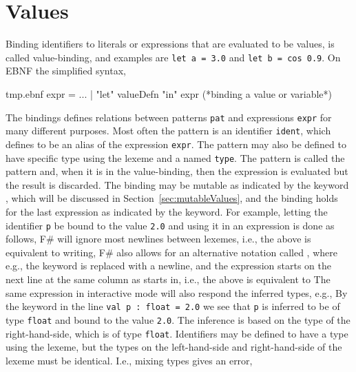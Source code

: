 \section{Values}
Binding identifiers to literals or expressions that are evaluated to be values, is called value-binding, and examples are \lstinline!let a = 3.0! and \lstinline!let b = cos 0.9!. On EBNF the simplified syntax,
%
\begin{verbatimwrite}{tmp.ebnf}
expr = ...
  | "let" valueDefn "in" expr (*binding a value or variable*)
\end{verbatimwrite}
%
The  bindings defines relations between patterns \lstinline[language=ebnf]!pat! and expressions \lstinline[language=ebnf]!expr! for many different purposes. Most often the pattern is an identifier \lstinline[language=ebnf]!ident!, which  defines to be an alias of the expression \lstinline[language=ebnf]!expr!. The pattern may also be defined to have specific type using the \idx{\lexeme{:}} lexeme and a named \lstinline[language=ebnf]!type!. The \lexeme{\_} pattern is called the  pattern and, when it is in the value-binding, then the expression is evaluated but the result is discarded. The binding may be mutable as indicated by the keyword , which will be discussed in Section~\ref{sec:mutableValues}, and the binding holds  for the last expression as indicated by the  keyword. For example, letting the identifier \lstinline!p! be bound to the value \lstinline!2.0! and using it in an expression is done as follows,
%
%
F\# will ignore most newlines between lexemes, i.e., the above is equivalent to writing,
%
%
F\# also allows for an alternative notation called , where e.g., the  keyword is replaced with a newline, and the expression starts on the next line at the same column as  starts in, i.e., the above is equivalent to
%
%
The same expression in interactive mode will also respond the inferred types, e.g.,
%
%
By the  keyword in the line \lstinline!val p : float = 2.0! we see that \lstinline!p! is inferred to be of type \lstinline!float! and bound to the value \lstinline!2.0!. The inference is based on the type of the right-hand-side, which is of type \lstinline!float!.  Identifiers may be defined to have a type using the \lexeme{:} lexeme, but the types on the left-hand-side and right-hand-side of the \lexeme{=} lexeme must be identical. I.e., mixing types gives an error,
